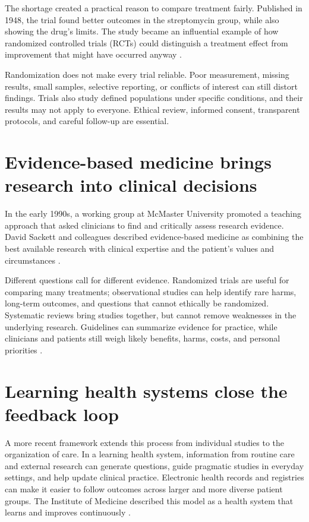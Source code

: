 \documentclass[12pt,oneside]{book}
\begin{document}
The shortage created a practical reason to compare treatment fairly. Published
in 1948, the trial found better outcomes in the streptomycin group, while also
showing the drug's limits. The study became an influential example of how
randomized controlled trials (RCTs) could distinguish a treatment effect from
improvement that might have occurred anyway \cite{mrcStreptomycin1948}.

Randomization does not make every trial reliable. Poor measurement, missing
results, small samples, selective reporting, or conflicts of interest can still
distort findings. Trials also study defined populations under specific
conditions, and their results may not apply to everyone. Ethical review,
informed consent, transparent protocols, and careful follow-up are essential.

\section{Evidence-based medicine brings research into clinical decisions}
In the early 1990s, a working group at McMaster University promoted a teaching
approach that asked clinicians to find and critically assess research evidence.
David Sackett and colleagues described evidence-based medicine as combining
the best available research with clinical expertise and the patient's values
and circumstances \cite{guyattEBM1992,sackettEBM1996}.

Different questions call for different evidence. Randomized trials are useful
for comparing many treatments; observational studies can help identify rare
harms, long-term outcomes, and questions that cannot ethically be randomized.
Systematic reviews bring studies together, but cannot remove weaknesses in
the underlying research. Guidelines can summarize evidence for practice, while
clinicians and patients still weigh likely benefits, harms, costs, and personal
priorities \cite{sackettEBM1996}.

\section{Learning health systems close the feedback loop}
A more recent framework extends this process from individual studies to the
organization of care. In a learning health system, information from routine
care and external research can generate questions, guide pragmatic studies in
everyday settings, and help update clinical practice. Electronic health records
and registries can make it easier to follow outcomes across larger and more
diverse patient groups. The Institute of Medicine described this model as a
health system that learns and improves continuously \cite{iomLearningHealth2013}.
\end{document}
